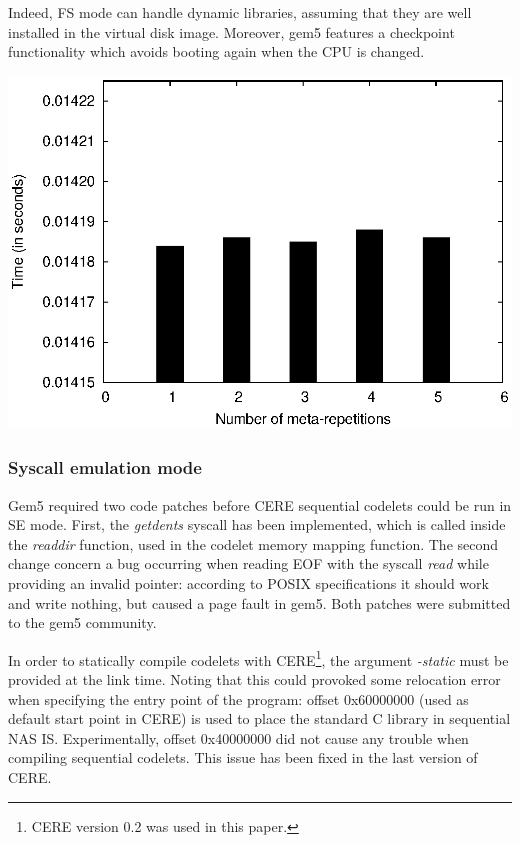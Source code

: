 \documentclass{article}
\newenvironment{Figure}
  {\par\medskip\noindent\center\minipage{0.9\linewidth}}
  {\endminipage\par\bigskip\medskip}
\begin{document}
\begin{multicols}{2}
Indeed, FS mode can handle dynamic libraries, assuming that they are well installed in the virtual disk image. 
Moreover, gem5 features a checkpoint functionality which avoids booting again when the CPU is changed.


\begin{Figure}
\centering
\includegraphics[width=\linewidth]{vari_se.eps}
\end{Figure}

\subsubsection{Syscall emulation mode}
Gem5 required two code patches before CERE sequential codelets could be run in SE mode. First, the \textit{getdents} syscall has been implemented, which is called inside the \textit{readdir} function, used in the codelet memory mapping function.
The second change concern a bug occurring when reading EOF with the syscall \textit{read} while providing an invalid pointer: according to POSIX specifications it should work and write nothing, but caused a page fault in gem5. Both patches were submitted to the gem5 community.


In order to statically compile codelets with CERE\footnote{CERE version 0.2 was used in this paper.}, the argument \textit{-static} must be provided at the link time. Noting that this could provoked some relocation error when specifying the entry point of the program: offset 0x60000000 (used as default start point in CERE) is used to place the standard C library in sequential NAS IS. Experimentally, offset 0x40000000 did not cause any trouble when compiling sequential codelets. This issue has been fixed in the last version of CERE.


\end{multicols}
\end{document}
